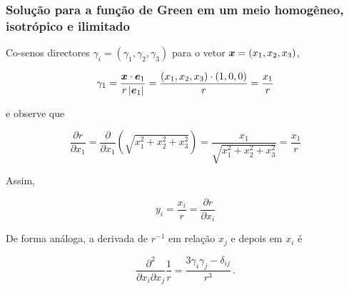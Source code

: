 \documentclass{beamer}
\newcommand{\xvec}{\vc{x}}
\newcommand{\evec}{\vc{e}}
\begin{document}
\begin{frame}
	\frametitle{\textbf{Solu\c{c}\~ao para a fun\c{c}\~ao de Green em um meio homog\^eneo, isotr\'opico e ilimitado}}
	
	\begin{flushleft}
		Co-senos directores $\gamma_i= (\gamma_1,\gamma_2,\gamma_3)$ para o vetor $\xvec = (x_1,x_2,x_3)$, 
	\end{flushleft}
	\begin{equation}
	\gamma_1 = \frac{\xvec \cdot \evec_1}{r \left| \evec_1 \right|} = \frac{(x_1,x_2,x_3) \cdot (1,0,0)}{r} = \frac{x_1}{r}
	\end{equation}
	\begin{flushleft}
		e observe que
	\end{flushleft}
	\begin{equation}
	\frac{\partial r}{\partial x_1} = \frac{\partial }{\partial x_1}\left( \sqrt{x_1^2 + x_2^2 + x_3^2} \right)   =  \frac{x_1}{\sqrt{x_1^2 + x_2^2 + x_3^2}} =  \frac{x_1}{r}
	\end{equation}
	\begin{flushleft}
		Assim,
	\end{flushleft}
	\begin{equation}
	y_i = \frac{x_i}{r} = \frac{\partial r}{\partial x_i}  
	\end{equation}
	\begin{flushleft}
		De forma an\'aloga, a derivada de $r^{-1}$ em rela\c{c}\~ao $x_j$ e depois em $x_i$ \'e
	\end{flushleft}
	\begin{equation}
	\frac{\partial^2}{\partial x_i \partial x_j} \frac{1}{r}  = \frac{3\gamma_i\gamma_j - \delta_{ij}}{r^3}\, .
	\end{equation}
	
\end{frame}%
\end{document}
